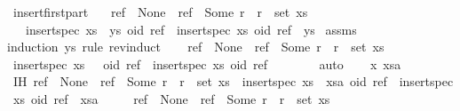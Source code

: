 \begin{isabellebody}
%
\endisatagproof
{\isafoldproof}%
%
\isadelimproof
\isanewline
%
\endisadelimproof
\isanewline
{}\isamarkupfalse%
\ insert{\isacharunderscore}first{\isacharunderscore}part{\isacharcolon}\isanewline
\ \ \ {\isachardoublequoteopen}ref\ {\isacharequal}\ None\ {\isasymor}\ {\isacharparenleft}ref\ {\isacharequal}\ Some\ r\ {\isasymand}\ r\ {\isasymin}\ set\ xs{\isacharparenright}{\isachardoublequoteclose}\isanewline
\ \ \ {\isachardoublequoteopen}insert{\isacharunderscore}spec\ {\isacharparenleft}xs\ {\isacharat}\ ys{\isacharparenright}\ {\isacharparenleft}oid{\isacharcomma}\ ref{\isacharparenright}\ {\isacharequal}\ {\isacharparenleft}insert{\isacharunderscore}spec\ xs\ {\isacharparenleft}oid{\isacharcomma}\ ref{\isacharparenright}{\isacharparenright}\ {\isacharat}\ ys{\isachardoublequoteclose}\isanewline
%
\isadelimproof
%
\endisadelimproof
%
\isatagproof
{}\isamarkupfalse%
\ assms\ \isamarkupfalse%
{\isacharparenleft}induction\ ys\ rule{\isacharcolon}\ rev{\isacharunderscore}induct{\isacharparenright}\isanewline
\ \ \isamarkupfalse%
\ {\isachardoublequoteopen}ref\ {\isacharequal}\ None\ {\isasymor}\ ref\ {\isacharequal}\ Some\ r\ {\isasymand}\ r\ {\isasymin}\ set\ xs{\isachardoublequoteclose}\isanewline
\ \ \isamarkupfalse%
\ {\isachardoublequoteopen}insert{\isacharunderscore}spec\ {\isacharparenleft}xs\ {\isacharat}\ {\isacharbrackleft}{\isacharbrackright}{\isacharparenright}\ {\isacharparenleft}oid{\isacharcomma}\ ref{\isacharparenright}\ {\isacharequal}\ insert{\isacharunderscore}spec\ xs\ {\isacharparenleft}oid{\isacharcomma}\ ref{\isacharparenright}\ {\isacharat}\ {\isacharbrackleft}{\isacharbrackright}{\isachardoublequoteclose}\isanewline
\ \ \ \ \isamarkupfalse%
\ auto\isanewline
{}\isamarkupfalse%
\isanewline
\ \ \isamarkupfalse%
\ x\ xsa\isanewline
\ \ \isamarkupfalse%
\ IH{\isacharcolon}\ {\isachardoublequoteopen}ref\ {\isacharequal}\ None\ {\isasymor}\ ref\ {\isacharequal}\ Some\ r\ {\isasymand}\ r\ {\isasymin}\ set\ xs\ {\isasymLongrightarrow}\ insert{\isacharunderscore}spec\ {\isacharparenleft}xs\ {\isacharat}\ xsa{\isacharparenright}\ {\isacharparenleft}oid{\isacharcomma}\ ref{\isacharparenright}\ {\isacharequal}\ insert{\isacharunderscore}spec\ xs\ {\isacharparenleft}oid{\isacharcomma}\ ref{\isacharparenright}\ {\isacharat}\ xsa{\isachardoublequoteclose}\isanewline
\ \ \ \ \ {\isachardoublequoteopen}ref\ {\isacharequal}\ None\ {\isasymor}\ ref\ {\isacharequal}\ Some\ r\ {\isasymand}\ r\ {\isasymin}\ set\ xs{\isachardoublequoteclose}\isanewline

\end{isabellebody}
